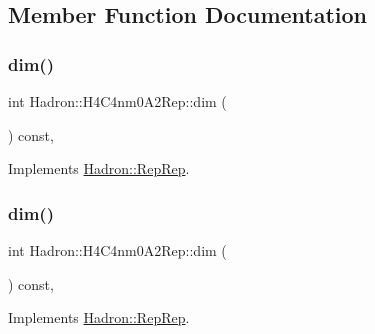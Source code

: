 \subsection{Member Function Documentation}
\mbox{\label{structHadron_1_1H4C4nm0A2Rep_a150c451dc8790702eb41daeb3f47d282}} 
\subsubsection{\texorpdfstring{dim()}{dim()}\hspace{0.1cm}{\footnotesize\ttfamily [1/5]}}
{\footnotesize\ttfamily int Hadron\+::\+H4\+C4nm0\+A2\+Rep\+::dim (\begin{DoxyParamCaption}{ }\end{DoxyParamCaption}) const\hspace{0.3cm}{\ttfamily [inline]}, {\ttfamily [virtual]}}



Implements \mbox{\hyperlink{structHadron_1_1RepRep_a92c8802e5ed7afd7da43ccfd5b7cd92b}{Hadron\+::\+Rep\+Rep}}.

\mbox{\label{structHadron_1_1H4C4nm0A2Rep_a150c451dc8790702eb41daeb3f47d282}} 
\subsubsection{\texorpdfstring{dim()}{dim()}\hspace{0.1cm}{\footnotesize\ttfamily [2/5]}}
{\footnotesize\ttfamily int Hadron\+::\+H4\+C4nm0\+A2\+Rep\+::dim (\begin{DoxyParamCaption}{ }\end{DoxyParamCaption}) const\hspace{0.3cm}{\ttfamily [inline]}, {\ttfamily [virtual]}}



Implements \mbox{\hyperlink{structHadron_1_1RepRep_a92c8802e5ed7afd7da43ccfd5b7cd92b}{Hadron\+::\+Rep\+Rep}}.

\mbox{\label{structHadron_1_1H4C4nm0A2Rep_a150c451dc8790702eb41daeb3f47d282}} 
